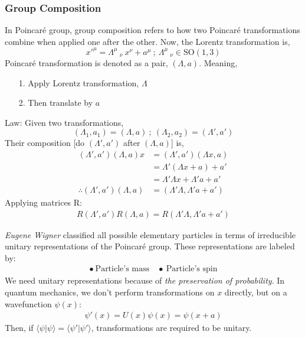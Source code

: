 \documentclass[14pt]{article} %
\begin{document}
\subsubsection{Group Composition}
In Poincaré group, group composition refers to how two Poincaré transformations combine when applied one after the other.
Now, the Lorentz transformation is,
$$x'^\mu = \Lambda^\mu~_\nu~x^\nu + a^\mu ~ ; ~\Lambda^\mu~_\nu \in \text{SO}(1,3)$$
Poincaré transformation is denoted as a pair, $(\Lambda, a)$. Meaning,
\begin{itemize}
    \item [1.] Apply Lorentz transformation, $\Lambda$ 
    \item [2.] Then translate by $a$
\end{itemize}
Law: 
Given two transformations,
$$
(\Lambda_1, a_1)=(\Lambda, a)~;~(\Lambda_2, a_2)=(\Lambda', a')
$$
Their composition [do $(\Lambda', a')$ after $(\Lambda, a)$] is,
\begin{align*}
    (\Lambda', a')(\Lambda, a)x &= (\Lambda', a')(\Lambda x, a) \\
                                &= \Lambda'(\Lambda x+a) + a' \\
                                &= \Lambda'\Lambda x+\Lambda' a + a' \\
  \therefore (\Lambda', a')(\Lambda, a) &= (\Lambda'\Lambda,\Lambda' a + a') \tag{4.2} \label{eq:4.2}
\end{align*}
Applying matrices R: 
\begin{align*}R(\Lambda', a')R(\Lambda, a) = R(\Lambda'\Lambda,\Lambda' a + a') \tag{4.3} \label{eq:4.3}
\end{align*}
\begin{tcolorbox}[ title=\textbf{Question: Why Unitary representation}]
\textit{Eugene Wigner} classified all possible elementary particles in terms of irreducible unitary representations of the Poincaré group. These representations are labeled by:
\begin{align*}
\bullet ~\text{Particle's mass}\quad \bullet ~\text{Particle's spin}
\end{align*}
We need unitary representations because of \textit{the preservation of probability}. In quantum mechanics, we don't perform transformations on $x$ directly, but on a wavefunction $\psi(x)$:
\begin{align*}
\psi'(x) = U(x)\psi(x) = \psi(x+a)
\end{align*}
Then, if $\langle \psi | \psi \rangle = \langle \psi' | \psi' \rangle$, transformations are required to be unitary.
\end{tcolorbox}
\end{document}

